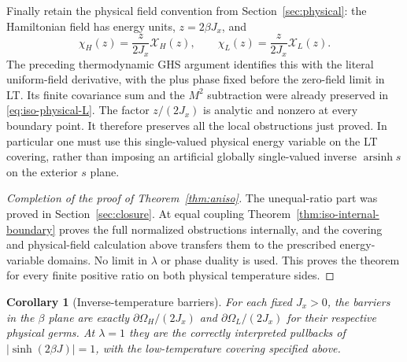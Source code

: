 \documentclass[11pt]{article}
\numberwithin{equation}{section}
\newtheorem{corollary}[theorem]{Corollary}
\theoremstyle{definition}
\newcommand{\OH}{\Omega_H}
\newcommand{\OL}{\Omega_L}
\begin{document}
Finally retain the physical field convention from
Section~\ref{sec:physical}: the Hamiltonian field has energy units,
$z=2\beta J_x$, and
\[
 \chi_H(z)=\frac{z}{2J_x}\mathcal X_H(z),\qquad
 \chi_L(z)=\frac{z}{2J_x}\mathcal X_L(z).
\]
The preceding thermodynamic GHS argument identifies this with the
literal uniform-field derivative, with the plus phase fixed before
the zero-field limit in LT.  Its finite covariance sum and the
$M^2$ subtraction were already preserved in
\eqref{eq:iso-physical-L}.  The factor $z/(2J_x)$ is analytic and
nonzero at every boundary point.  It therefore preserves all the
local obstructions just proved.  In particular one must use this
single-valued physical energy variable on the LT covering, rather
than imposing an artificial globally single-valued inverse
$\operatorname{arsinh}s$ on the exterior $s$ plane.


\begin{proof}[Completion of the proof of Theorem~\ref{thm:aniso}]
The unequal-ratio part was proved in Section~\ref{sec:closure}.
At equal coupling Theorem~\ref{thm:iso-internal-boundary} proves
the full normalized obstructions internally, and the covering and
physical-field calculation above transfers them to the prescribed
energy-variable domains. No limit in $\lambda$ or phase duality is used. This proves the theorem for every finite positive ratio on
both physical temperature sides.
\end{proof}

\begin{corollary}[Inverse-temperature barriers]\label{cor:alllambda}
For each fixed $J_x>0$, the barriers in the $\beta$ plane are exactly
$\partial\OH/(2J_x)$ and $\partial\OL/(2J_x)$ for their respective
physical germs. At $\lambda=1$ they are the correctly interpreted
pullbacks of $|\sinh(2\beta J)|=1$, with the low-temperature covering
specified above.
\end{corollary}
\end{document}
